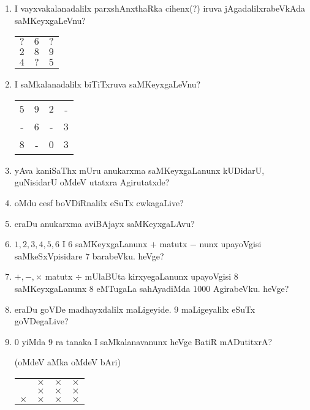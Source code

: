 \begin{enumerate}
\item I vayxvakalanadalilx parxshAnxthaRka cihenx(?) iruva jAgadalilxrabeVkAda saMKeyxgaLeVnu?
\begin{center}
\begin{tabular}{ccc}
$?$ & $6$ & $?$\\
$2$ & $8$ & $9$\\
\hline
$4$ & $?$ & $5$
\end{tabular}
\end{center}



\item I saMkalanadalilx \underline{\qquad} biTiTxruva saMKeyxgaLeVnu?
\begin{center}
\begin{tabular}{cccc}
$5$ & $9$ & $2$ & -\\
- & $6$ & - & $3$\\
\hline
$8$ & - & $0$ & $3$
\end{tabular}
\end{center}

\item yAva kaniSaThx mUru anukarxma saMKeyxgaLanunx kUDidarU, guNisidarU oMdeV utatxra Agirutatxde?

\item oMdu cesf boVDiRnalilx eSuTx cwkagaLive?

\item eraDu anukarxma aviBAjayx saMKeyxgaLAvu?

\item $1,2,3,4,5,6$ I $6$ saMKeyxgaLanunx $+$ matutx $-$ nunx upayoVgisi saMkeSxVpisidare $7$ barabeVku. heVge?

\item $+,-,\times$ matutx $\div$ mUlaBUta kirxyegaLanunx upayoVgisi $8$ saMKeyxgaLanunx $8$ eMTugaLa sahAyadiMda $1000$ AgirabeVku. heVge?

\item eraDu goVDe madhayxdalilx maLigeyide. $9$ maLigeyalilx eSuTx goVDegaLive?

\item $0$ yiMda $9$ ra tanaka I saMkalanavanunx heVge BatiR mADutitxrA?

(oMdeV aMka oMdeV bAri)
\begin{center}
\begin{tabular}{cccc}
 & $\times$ & $\times$ & $\times$\\
 & $\times$ & $\times$ & $\times$\\
\hline
$\times$ & $\times$ & $\times$ & $\times$\\
\end{tabular}
\end{center}


\end{enumerate}
